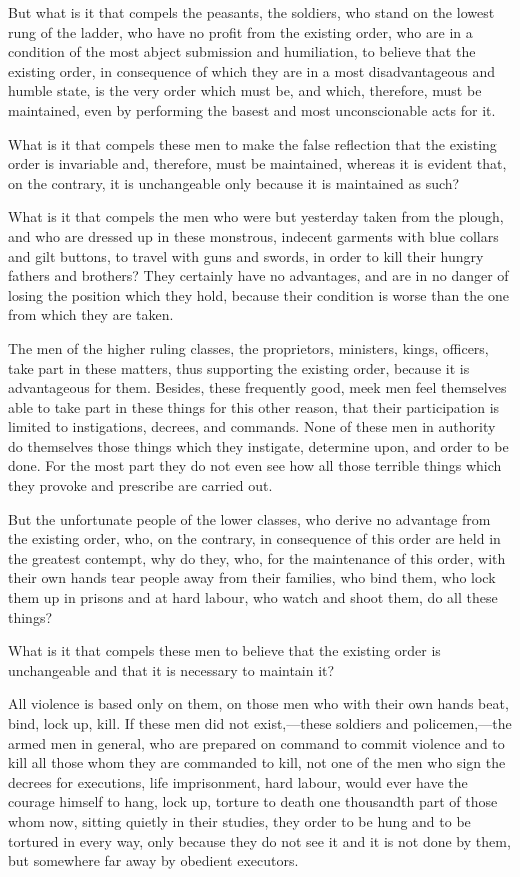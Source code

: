 \documentclass{book}
\begin{document}
But what is it that compels the peasants, the soldiers, who stand on the lowest rung of the ladder, who have no profit from the existing order, who are in a condition of the most abject submission and humiliation, to believe that the existing order, in consequence of which they are in a most disadvantageous and humble state, is the very order which must be, and which, therefore, must be maintained, even by performing the basest and most unconscionable acts for it.

What is it that compels these men to make the false reflection that the existing order is invariable and, therefore, must be maintained, whereas it is evident that, on the contrary, it is unchangeable only because it is maintained as such?

What is it that compels the men who were but yesterday taken from the plough, and who are dressed up in these monstrous, indecent garments with blue collars and gilt buttons, to travel with guns and swords, in order to kill their hungry fathers and brothers? They certainly have no advantages, and are in no danger of losing the position which they hold, because their condition is worse than the one from which they are taken.

The men of the higher ruling classes, the proprietors, ministers, kings, officers, take part in these matters, thus supporting the existing order, because it is advantageous for them. Besides, these frequently good, meek men feel themselves able to take part in these things for this other reason, that their participation is limited to instigations, decrees, and commands. None of these men in authority do themselves those things which they instigate, determine upon, and order to be done. For the most part they do not even see how all those terrible things which they provoke and prescribe are carried out.

But the unfortunate people of the lower classes, who derive no advantage from the existing order, who, on the contrary, in consequence of this order are held in the greatest contempt, why do they, who, for the maintenance of this order, with their own hands tear people away from their families, who bind them, who lock them up in prisons and at hard labour, who watch and shoot them, do all these things?

What is it that compels these men to believe that the existing order is unchangeable and that it is necessary to maintain it?

All violence is based only on them, on those men who with their own hands beat, bind, lock up, kill. If these men did not exist,—these soldiers and policemen,—the armed men in general, who are prepared on command to commit violence and to kill all those whom they are commanded to kill, not one of the men who sign the decrees for executions, life imprisonment, hard labour, would ever have the courage himself to hang, lock up, torture to death one thousandth part of those whom now, sitting quietly in their studies, they order to be hung and to be tortured in every way, only because they do not see it and it is not done by them, but somewhere far away by obedient executors.
\end{document}
